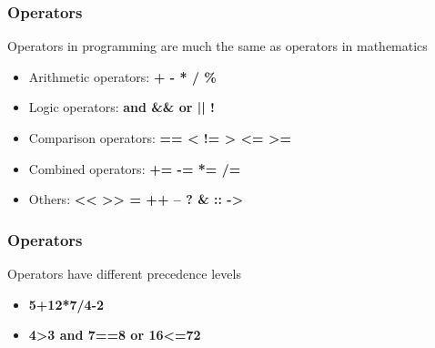 \documentclass[14pt,a4paper,dvipsnames,usenames]{beamer}
\begin{document}
\begin{frame}
  \frametitle{Operators}

  Operators in programming are much the same as operators in mathematics %

  \vspace{.5em}

  \begin{itemize}
    \setlength\itemsep{.5em}
    \item Arithmetic operators: \hspace{.25em} {\ttfamily\bfseries\color{Tropiteal} + - * / \%}
    \item Logic operators: \hspace{.25em} {\ttfamily\bfseries\color{Tropiteal} and \&\& or || !}
    \item Comparison operators: \hspace{.25em} {\ttfamily\bfseries\color{Tropiteal} == < != > <= >=}
    \item Combined operators:  \hspace{.25em} {\ttfamily\bfseries\color{Tropiteal} += -= *= /=}
    \item Others: \hspace{.25em} {\ttfamily\bfseries\color{Tropiteal} << >> = ++ -- ? \& :: ->}
  \end{itemize}
  
\end{frame}

\begin{frame}[fragile]
  \frametitle{Operators}

  Operators have different precedence levels

  \vspace{1em}
  \begin{itemize}
    \setlength\itemsep{1em}
    \item {\ttfamily\bfseries 5+12*7/4-2} \hspace{.25em}  
    \item {\ttfamily\bfseries 4>3 and 7==8 or 16<=72} \hspace{.25em}
  \end{itemize}

  \vspace{1em}
  
\end{frame}
\end{document}
